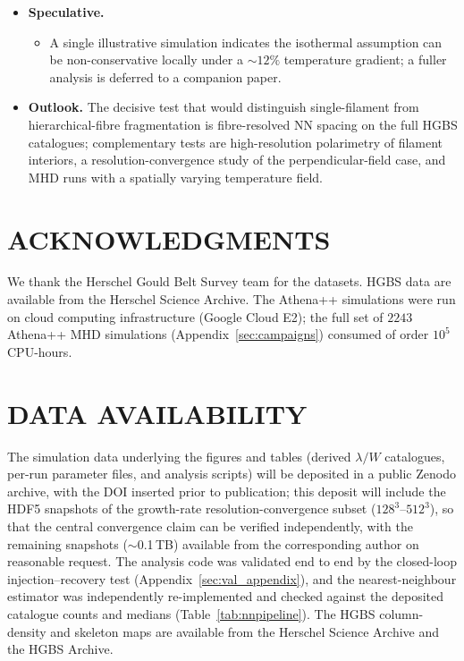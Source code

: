 \documentclass[usenatbib,twoside,twocolumn]{mnras}
\begin{document}
\begin{itemize}
    \item \textbf{Speculative.}
    \begin{itemize}
        \item A single illustrative simulation indicates the isothermal assumption can be non-conservative locally under a $\sim12\%$ temperature gradient; a fuller analysis is deferred to a companion paper.
    \end{itemize}

    \item \textbf{Outlook.} The decisive test that would distinguish single-filament from hierarchical-fibre fragmentation is fibre-resolved NN spacing on the full HGBS catalogues; complementary tests are high-resolution polarimetry of filament interiors, a resolution-convergence study of the perpendicular-field case, and MHD runs with a spatially varying temperature field.
    \end{itemize}

\section*{ACKNOWLEDGMENTS}

We thank the Herschel Gould Belt Survey team for the datasets. HGBS data are available from the Herschel Science Archive. The Athena++ simulations were run on cloud computing infrastructure (Google Cloud E2); the full set of $2243$ Athena++ MHD simulations (Appendix~\ref{sec:campaigns}) consumed of order $10^5$ CPU-hours.

\section*{DATA AVAILABILITY}

The simulation data underlying the figures and tables (derived $\lambda/W$ catalogues, per-run parameter files, and analysis scripts) will be deposited in a public Zenodo archive, with the DOI inserted prior to publication; this deposit will include the HDF5 snapshots of the growth-rate resolution-convergence subset ($128^3$--$512^3$), so that the central convergence claim can be verified independently, with the remaining snapshots ($\sim$0.1\,TB) available from the corresponding author on reasonable request. The analysis code was validated end to end by the closed-loop injection--recovery test (Appendix~\ref{sec:val_appendix}), and the nearest-neighbour estimator was independently re-implemented and checked against the deposited catalogue counts and medians (Table~\ref{tab:nnpipeline}). The HGBS column-density and skeleton maps are available from the Herschel Science Archive and the HGBS Archive.
\end{document}
